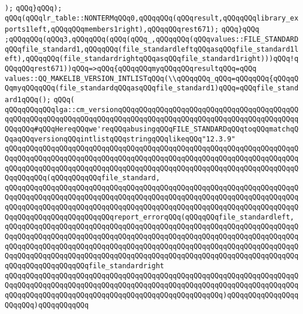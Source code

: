 \verb|);|\newline
\verb|qQQq}qQQq);|\newline
\verb|qQQq(qQQqlr_table::NONTERMqQQq0,qQQqqQQq(qQQqresult,qQQqqQQqlibrary_exports1left,qQQqqQQqmembers1right),qQQqqQQqrest671);|\newline
\verb|qQQq}qQQq|\newline
\verb|;qQQqqQQq(qQQq3,qQQqqQQq(qQQq(qQQq_,qQQqqQQq(qQQqvalues::FILE_STANDARDqQQqfile_standard1,qQQqqQQq(file_standardleftqQQqasqQQqfile_standard1left),qQQqqQQq(file_standardrightqQQqasqQQqfile_standard1right)))qQQq!qQQqqQQqrest671))qQQq=>qQQq{qQQqqQQqmyqQQqqQQqresultqQQq=qQQq|\newline
\verb|values::QQ_MAKELIB_VERSION_INTLISTqQQq(\\qQQqqQQq_qQQq=qQQqqQQq{qQQqqQQqmyqQQqqQQq(file_standardqQQqasqQQqfile_standard1)qQQq=qQQqfile_standard1qQQq();|\newline
\verb|qQQq(|\newline
\verb|qQQqqQQqqQQqlga::cm_versionqQQqqQQqqQQqqQQqqQQqqQQqqQQqqQQqqQQqqQQqqQQqqQQqqQQqqQQqqQQqqQQqqQQqqQQqqQQqqQQqqQQqqQQqqQQqqQQqqQQqqQQqqQQqqQQqqQQqqQQq#qQQqHereqQQqwe'reqQQqabusingqQQqFILE_STANDARDqQQqtoqQQqmatchqQQqaqQQqversionqQQqintlistqQQqstringqQQqlikeqQQq"12.3.9"|\newline
\verb|qQQqqQQqqQQqqQQqqQQqqQQqqQQqqQQqqQQqqQQqqQQqqQQqqQQqqQQqqQQqqQQqqQQqqQQqqQQqqQQqqQQqqQQqqQQqqQQqqQQqqQQqqQQqqQQqqQQqqQQqqQQqqQQqqQQqqQQqqQQqqQQqqQQqqQQqqQQqqQQqqQQqqQQqqQQqqQQqqQQqqQQqqQQqqQQqqQQqqQQqqQQqqQQqqQQqqQQqqQQq(qQQqqQQqqQQqfile_standard,|\newline
\verb|qQQqqQQqqQQqqQQqqQQqqQQqqQQqqQQqqQQqqQQqqQQqqQQqqQQqqQQqqQQqqQQqqQQqqQQqqQQqqQQqqQQqqQQqqQQqqQQqqQQqqQQqqQQqqQQqqQQqqQQqqQQqqQQqqQQqqQQqqQQqqQQqqQQqqQQqqQQqqQQqqQQqqQQqqQQqqQQqqQQqqQQqqQQqqQQqqQQqqQQqqQQqqQQqqQQqqQQqqQQqqQQqqQQqqQQqqQQqreport_errorqQQq(qQQqqQQqfile_standardleft,|\newline
\verb|qQQqqQQqqQQqqQQqqQQqqQQqqQQqqQQqqQQqqQQqqQQqqQQqqQQqqQQqqQQqqQQqqQQqqQQqqQQqqQQqqQQqqQQqqQQqqQQqqQQqqQQqqQQqqQQqqQQqqQQqqQQqqQQqqQQqqQQqqQQqqQQqqQQqqQQqqQQqqQQqqQQqqQQqqQQqqQQqqQQqqQQqqQQqqQQqqQQqqQQqqQQqqQQqqQQqqQQqqQQqqQQqqQQqqQQqqQQqqQQqqQQqqQQqqQQqqQQqqQQqqQQqqQQqqQQqqQQqqQQqqQQqqQQqqQQqqQQqqQQqfile_standardright|\newline
\verb|qQQqqQQqqQQqqQQqqQQqqQQqqQQqqQQqqQQqqQQqqQQqqQQqqQQqqQQqqQQqqQQqqQQqqQQqqQQqqQQqqQQqqQQqqQQqqQQqqQQqqQQqqQQqqQQqqQQqqQQqqQQqqQQqqQQqqQQqqQQqqQQqqQQqqQQqqQQqqQQqqQQqqQQqqQQqqQQqqQQqqQQqqQQqqQQq)qQQqqQQqqQQqqQQqqQQqqQQq)qQQqqQQqqQQq|\newline
